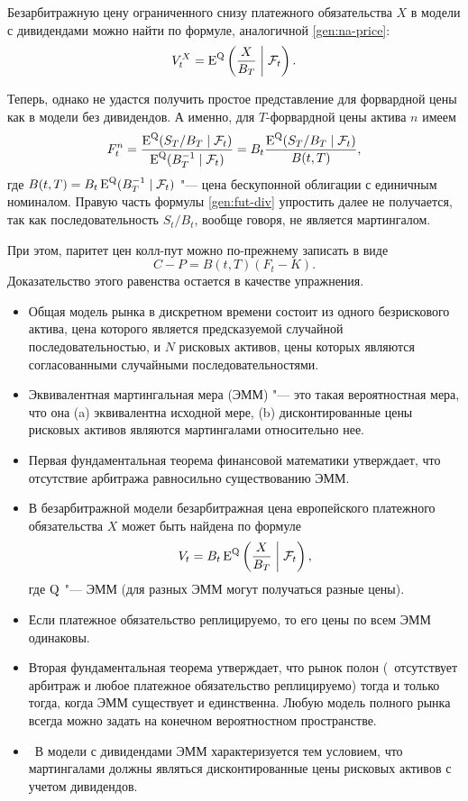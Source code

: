 Безарбитражную цену ограниченного снизу платежного обязательства $X$ в модели с дивидендами можно найти по формуле, аналогичной \eqref{gen:na-price}:
\[
V_t^X = \operatorname{E}^{\mathrm{Q}}\left(\frac{X}{B_T} \;\bigg|\;\mathcal{F}_t\right).
\]

Теперь, однако не удастся получить простое представление для форвардной цены как в модели без дивидендов. А именно, для $T$-форвардной цены актива $n$ имеем
\begin{equation}
\label{gen:fut-div}
F_t^n = \frac{\operatorname{E}^{\mathrm{Q}}(S_T/B_T \mid \mathcal{F}_t)}{\operatorname{E}^{\mathrm{Q}}(B_T^{-1}\mid \mathcal{F}_t)} = B_t\frac{\operatorname{E}^{\mathrm{Q}}(S_T/B_T \mid \mathcal{F}_t)}{B(t,T)},
\end{equation}
где $B(t,T) = B_t\operatorname{E}^{\mathrm{Q}}(B_T^{-1} \mid \mathcal{F}_t)$ "--- цена бескупонной облигации с единичным номиналом.
Правую часть формулы \eqref{gen:fut-div} упростить далее не получается, так как последовательность $S_t/B_t$, вообще говоря, не является мартингалом.

При этом, паритет цен колл-пут можно по-прежнему записать в виде
\[
C - P = B(t,T)(F_t - K).
\]
Доказательство этого равенства остается в качестве упражнения.


\summary

\begin{itemize}
\item Общая модель рынка в дискретном времени состоит из одного безрискового актива, цена которого является предсказуемой случайной последовательностью, и $N$ рисковых активов, цены которых являются согласованными случайными последовательностями.
\item Эквивалентная мартингальная мера (ЭММ) "--- это такая вероятностная мера, что она (a) эквивалентна исходной мере, (b) дисконтированные цены рисковых активов являются мартингалами относительно нее.

\item Первая фундаментальная теорема финансовой математики утверждает, что отсутствие арбитража равносильно существованию ЭММ.

\item В безарбитражной модели безарбитражная цена европейского платежного обязательства $X$ может быть найдена по формуле 
\[
V_t =  B_t \operatorname{E}^{\mathrm{Q}} \left( \frac{X}{B_T} \;\bigg|\; \mathcal{F}_t \right),
\]
где $\mathrm{Q}$ "--- ЭММ (для разных ЭММ могут получаться разные цены).

\item Если платежное обязательство реплицируемо, то его цены по всем ЭММ одинаковы.

\item Вторая фундаментальная теорема утверждает, что рынок полон (\te\ отсутствует арбитраж и любое платежное обязательство реплицируемо) тогда и только тогда, когда ЭММ существует и единственна. Любую модель полного рынка всегда можно задать на конечном вероятностном пространстве.

\item \difficult\ В модели с дивидендами ЭММ характеризуется тем условием, что мартингалами должны являться дисконтированные цены рисковых активов с учетом дивидендов.
\end{itemize}
